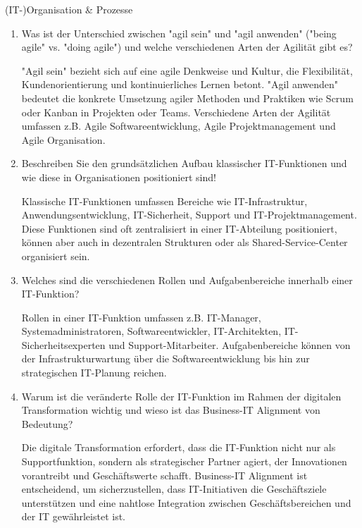 \documentclass{article}
\begin{document}
\begin{exercise}{(IT-)Organisation \& Prozesse}
\begin{enumerate}
    \item Was ist der Unterschied zwischen "agil sein" und "agil anwenden" ("being agile" vs. "doing agile") und welche verschiedenen Arten der Agilität gibt es?
          \begin{solution}
            "Agil sein" bezieht sich auf eine agile Denkweise und Kultur, die Flexibilität, Kundenorientierung und kontinuierliches Lernen betont. "Agil anwenden" bedeutet die konkrete Umsetzung agiler Methoden und Praktiken wie Scrum oder Kanban in Projekten oder Teams. Verschiedene Arten der Agilität umfassen z.B. Agile Softwareentwicklung, Agile Projektmanagement und Agile Organisation.
          \end{solution}

    \item Beschreiben Sie den grundsätzlichen Aufbau klassischer IT-Funktionen und wie diese in Organisationen positioniert sind!
          \begin{solution}
            Klassische IT-Funktionen umfassen Bereiche wie IT-Infrastruktur, Anwendungsentwicklung, IT-Sicherheit, Support und IT-Projektmanagement. Diese Funktionen sind oft zentralisiert in einer IT-Abteilung positioniert, können aber auch in dezentralen Strukturen oder als Shared-Service-Center organisiert sein.
          \end{solution}

    \item Welches sind die verschiedenen Rollen und Aufgabenbereiche innerhalb einer IT-Funktion?
          \begin{solution}
            Rollen in einer IT-Funktion umfassen z.B. IT-Manager, Systemadministratoren, Softwareentwickler, IT-Architekten, IT-Sicherheitsexperten und Support-Mitarbeiter. Aufgabenbereiche können von der Infrastrukturwartung über die Softwareentwicklung bis hin zur strategischen IT-Planung reichen.
          \end{solution}

    \item Warum ist die veränderte Rolle der IT-Funktion im Rahmen der digitalen Transformation wichtig und wieso ist das Business-IT Alignment von Bedeutung?
          \begin{solution}
            Die digitale Transformation erfordert, dass die IT-Funktion nicht nur als Supportfunktion, sondern als strategischer Partner agiert, der Innovationen vorantreibt und Geschäftswerte schafft. Business-IT Alignment ist entscheidend, um sicherzustellen, dass IT-Initiativen die Geschäftsziele unterstützen und eine nahtlose Integration zwischen Geschäftsbereichen und der IT gewährleistet ist.
          \end{solution}
  \end{enumerate}
\end{exercise}
\end{document}
